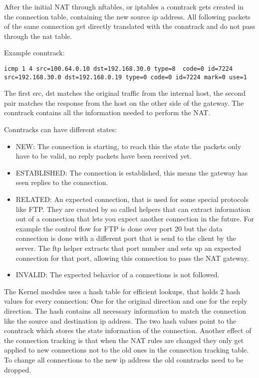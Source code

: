 \documentclass{report}
\begin{document}
After the initial NAT through nftables, or iptables a conntrack gets
created in the connection table, containing the new source ip address.
All following packets of the same connection get directly translated
with the conntrack and do not pass through the nat table.

Example conntrack:

\begin{verbatim}
icmp 1 4 src=100.64.0.10 dst=192.168.30.0 type=8  code=0 id=7224
src=192.168.30.0 dst=192.168.0.19 type=0 code=0 id=7224 mark=0 use=1
\end{verbatim}

The first src, dst matches the original traffic from the internal host,
the second pair matches the response from the host on the other side of
the gateway. The conntrack contains all the information needed to
perform the NAT.

Conntracks can have different states:

\begin{itemize}
\item
  NEW: The connection is starting, to reach this the state the packets
  only have to be valid, no reply packets have been received yet.
\item
  ESTABLISHED: The connection is established, this means the gateway has
  seen replies to the connection.
\item
  RELATED: An expected connection, that is used for some special
  protocols like FTP. They are created by so called helpers that can
  extract information out of a connection that lets you expect another
  connection in the future. For example the control flow for FTP is done
  over port 20 but the data connection is done with a different port
  that is send to the client by the server. The ftp helper extracts that
  port number and sets up an expected connection for that port, allowing
  this connection to pass the NAT gateway.
\item
  INVALID: The expected behavior of a connections is not followed.
\end{itemize}

The Kernel modules uses a hash table for efficient lookups, that holds 2
hash values for every connection: One for the original direction and one
for the reply direction. The hash contains all necessary information to
match the connection like the source and destination ip address. The two
hash values point to the conntrack which stores the state information of
the connection. Another effect of the connection tracking is that when
the NAT rules are changed they only get applied to new connections not
to the old ones in the connection tracking table. To change all
connections to the new ip address the old conntracks need to be dropped.
\end{document}
